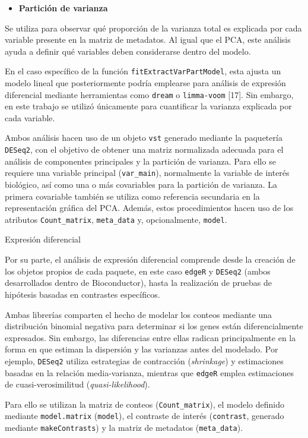 \documentclass[
  9pt,
]{article}
\providecommand{\tightlist}{%
  \setlength{\itemsep}{0pt}\setlength{\parskip}{0pt}}
\begin{document}
\begin{itemize}
\tightlist
\item
  \textbf{Partición de varianza}
\end{itemize}

Se utiliza para observar qué proporción de la varianza total es
explicada por cada variable presente en la matriz de metadatos. Al igual
que el PCA, este análisis ayuda a definir qué variables deben
considerarse dentro del modelo.

En el caso específico de la función \texttt{fitExtractVarPartModel},
esta ajusta un modelo lineal que posteriormente podría emplearse para
análisis de expresión diferencial mediante herramientas como
\texttt{dream} o \texttt{limma-voom} {[}17{]}. Sin embargo, en este
trabajo se utilizó únicamente para cuantificar la varianza explicada por
cada variable.

Ambos análisis hacen uso de un objeto \texttt{vst} generado mediante la
paquetería \texttt{DESeq2}, con el objetivo de obtener una matriz
normalizada adecuada para el análisis de componentes principales y la
partición de varianza. Para ello se requiere una variable principal
(\texttt{var\_main}), normalmente la variable de interés biológico, así
como una o más covariables para la partición de varianza. La primera
covariable también se utiliza como referencia secundaria en la
representación gráfica del PCA. Además, estos procedimientos hacen uso
de los atributos \texttt{Count\_matrix}, \texttt{meta\_data} y,
opcionalmente, \texttt{model}.

Expresión diferencial

Por su parte, el análisis de expresión diferencial comprende desde la
creación de los objetos propios de cada paquete, en este caso
\texttt{edgeR} y \texttt{DESeq2} (ambos desarrollados dentro de
Bioconductor), hasta la realización de pruebas de hipótesis basadas en
contrastes específicos.

Ambas librerías comparten el hecho de modelar los conteos mediante una
distribución binomial negativa para determinar si los genes están
diferencialmente expresados. Sin embargo, las diferencias entre ellas
radican principalmente en la forma en que estiman la dispersión y las
varianzas antes del modelado. Por ejemplo, \texttt{DESeq2} utiliza
estrategias de contracción (\emph{shrinkage}) y estimaciones basadas en
la relación media-varianza, mientras que \texttt{edgeR} emplea
estimaciones de cuasi-verosimilitud (\emph{quasi-likelihood}).

Para ello se utilizan la matriz de conteos (\texttt{Count\_matrix}), el
modelo definido mediante \texttt{model.matrix} (\texttt{model}), el
contraste de interés (\texttt{contrast}, generado mediante
\texttt{makeContrasts}) y la matriz de metadatos (\texttt{meta\_data}).
\end{document}
